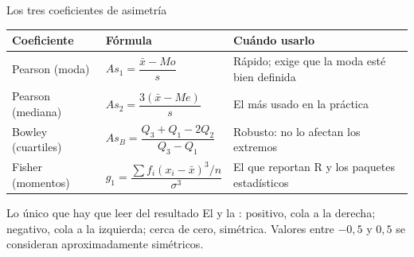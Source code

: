 \documentclass[aspectratio=169,10pt]{beamer}
\begin{document}
\begin{frame}{Los tres coeficientes de asimetría}
  \scriptsize
  \begin{center}
  \begin{tabular}{@{}p{3.3cm}p{4.0cm}p{4.6cm}@{}}
    \toprule
    \textbf{Coeficiente} & \textbf{Fórmula} & \textbf{Cuándo usarlo} \\
    \midrule
    Pearson (moda) &
      $As_1 = \dfrac{\bar{x}-Mo}{s}$ &
      Rápido; exige que la moda esté bien definida \\
    \addlinespace
    Pearson (mediana) &
      $As_2 = \dfrac{3(\bar{x}-Me)}{s}$ &
      El más usado en la práctica \\
    \addlinespace
    Bowley (cuartiles) &
      $As_B = \dfrac{Q_3+Q_1-2Q_2}{Q_3-Q_1}$ &
      Robusto: no lo afectan los extremos \\
    \addlinespace
    Fisher (momentos) &
      $g_1 = \dfrac{\sum f_i(x_i-\bar{x})^3 / n}{\sigma^3}$ &
      El que reportan R y los paquetes estadísticos \\
    \bottomrule
  \end{tabular}
  \end{center}

  \vspace{0.1cm}
  \begin{alertblock}{Lo único que hay que leer del resultado}
    \scriptsize
    El  y la : positivo, cola a la derecha;
    negativo, cola a la izquierda; cerca de cero, simétrica. Valores entre
    $-0{,}5$ y $0{,}5$ se consideran aproximadamente simétricos.
  \end{alertblock}
\end{frame}
\end{document}
